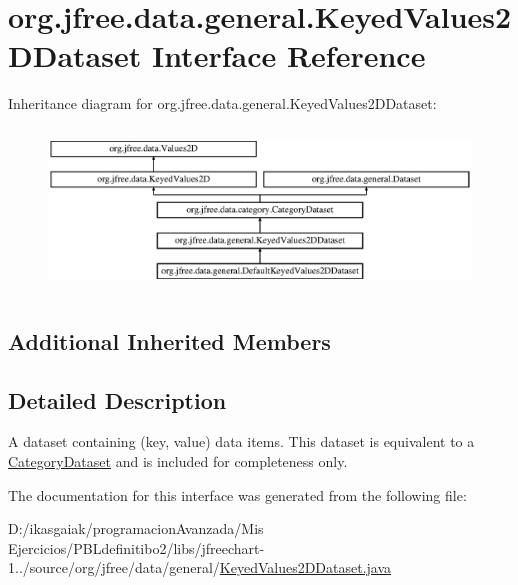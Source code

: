 \hypertarget{interfaceorg_1_1jfree_1_1data_1_1general_1_1_keyed_values2_d_dataset}{}\section{org.\+jfree.\+data.\+general.\+Keyed\+Values2\+D\+Dataset Interface Reference}
\label{interfaceorg_1_1jfree_1_1data_1_1general_1_1_keyed_values2_d_dataset}
Inheritance diagram for org.\+jfree.\+data.\+general.\+Keyed\+Values2\+D\+Dataset\+:\begin{figure}[H]
\begin{center}
\leavevmode
\includegraphics[height=4.361371cm]{interfaceorg_1_1jfree_1_1data_1_1general_1_1_keyed_values2_d_dataset}
\end{center}
\end{figure}
\subsection*{Additional Inherited Members}


\subsection{Detailed Description}
A dataset containing (key, value) data items. This dataset is equivalent to a \mbox{\hyperlink{}{Category\+Dataset}} and is included for completeness only. 

The documentation for this interface was generated from the following file\+:\begin{DoxyCompactItemize}
\item 
D\+:/ikasgaiak/programacion\+Avanzada/\+Mis Ejercicios/\+P\+B\+Ldefinitibo2/libs/jfreechart-\/1../source/org/jfree/data/general/\mbox{\hyperlink{_keyed_values2_d_dataset_8java}{Keyed\+Values2\+D\+Dataset.\+java}}\end{DoxyCompactItemize}
